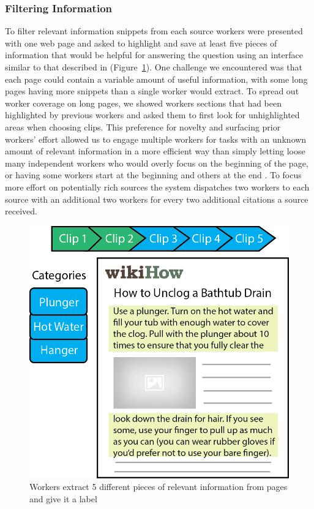 \subsubsection{Filtering Information}

To filter relevant information snippets from each source workers were presented with one web page and asked to highlight and save at least five pieces of information that would be helpful for answering the question using an interface similar to that described in \cite{kittur2013costs} (Figure~\ref{fig:clipping}). One challenge we encountered was that each page could contain a variable amount of useful information, with some long pages having more snippets than a single worker would extract. To spread out worker coverage on long pages, we showed workers sections that had been highlighted by previous workers and asked them to first look for unhighlighted areas when choosing clips. This preference for novelty and surfacing prior workers' effort allowed us to engage multiple workers for tasks with an unknown amount of relevant information in a more efficient way than simply letting loose many independent workers who would overly focus on the beginning of the page, or having some workers start at the beginning and others at the end \cite{bernstein2010soylent}. To focus more effort on potentially rich sources the system dispatches two workers to each source with an additional two workers for every two additional citations a source received.

\begin{figure}[!ht]
    \centering
    \includegraphics[width=0.5\columnwidth]{Chapters/KA/clipping}
    \caption[Crowdworkers extract and label information from webpages]{Workers extract 5 different pieces of relevant information from pages and give it a label}
    \label{fig:clipping}
\end{figure}

